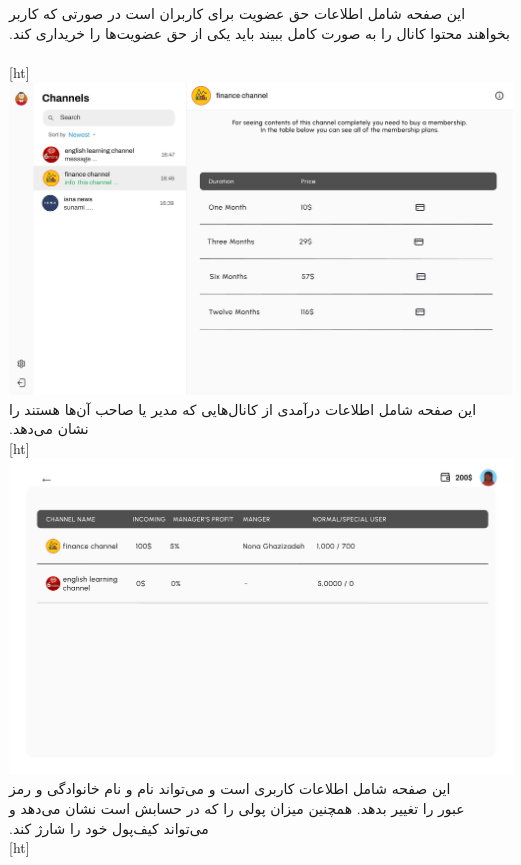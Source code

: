 ‫
‫
‫این صفحه شامل اطلاعات حق عضویت برای کاربران است در صورتی که کاربر بخواهند محتوا کانال را به صورت کامل ببیند باید یکی از حق عضویت‌ها را خریداری کند.
‫\\
‫[ht]
\includegraphics[scale=0.2]{figs/info_user_channel_page.jpeg}
‫
‫
‫
‫‫ \FloatBarrier
‫\clearpage
‫
‫
‫این صفحه شامل اطلاعات درآمدی از کانال‌هایی که مدیر یا صاحب آن‌ها هستند را نشان می‌دهد.
‫\\
‫[ht]
\includegraphics[scale=0.2]{figs/admin_page.jpeg}
‫
‫
‫
‫‫ \FloatBarrier
‫\clearpage
‫
‫
‫این صفحه شامل اطلاعات کاربری است و می‌تواند نام و نام خانوادگی و رمز عبور را تغییر بدهد. همچنین میزان پولی را که در حسابش است نشان می‌دهد و می‌تواند کیف‌پول خود را شارژ کند.
‫\\
‫[ht]
